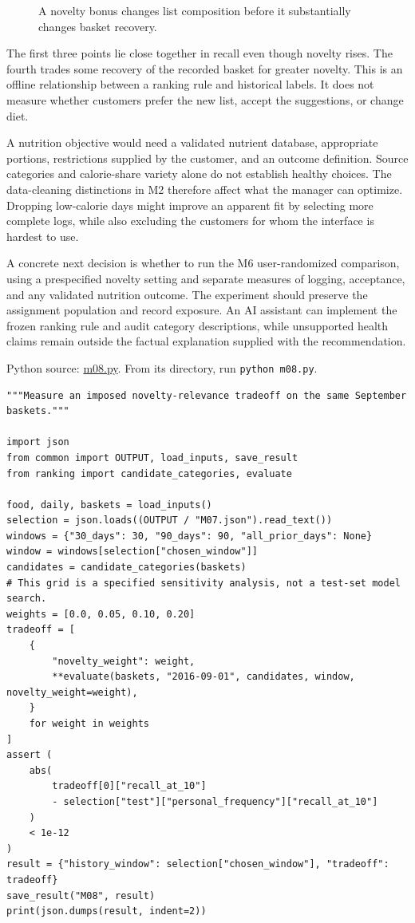 \begin{figure}[htbp]
\centering

\caption{A novelty bonus changes list composition before it substantially changes basket recovery.}\label{fig:M08_mhealth_tradeoff}
\end{figure}

The first three points lie close together in recall even though novelty
rises. The fourth trades some recovery of the recorded basket for
greater novelty. This is an offline relationship between a ranking rule
and historical labels. It does not measure whether customers prefer the
new list, accept the suggestions, or change diet.

A nutrition objective would need a validated nutrient database,
appropriate portions, restrictions supplied by the customer, and an
outcome definition. Source categories and calorie-share variety alone do
not establish healthy choices. The data-cleaning distinctions in M2
therefore affect what the manager can optimize. Dropping low-calorie
days might improve an apparent fit by selecting more complete logs,
while also excluding the customers for whom the interface is hardest to
use.

A concrete next decision is whether to run the M6 user-randomized
comparison, using a prespecified novelty setting and separate measures
of logging, acceptance, and any validated nutrition outcome. The
experiment should preserve the assignment population and record
exposure. An AI assistant can implement the frozen ranking rule and
audit category descriptions, while unsupported health claims remain
outside the factual explanation supplied with the recommendation.

\FloatBarrier
{}
Python source:
\href{../03_Data_and_Code/mHealth/recurring_examples/m08.py}{m08.py}.
From its directory, run \texttt{python\ m08.py}.

\begin{Verbatim}[breaklines,breakanywhere,fontsize=\small]
"""Measure an imposed novelty-relevance tradeoff on the same September baskets."""

import json
from common import OUTPUT, load_inputs, save_result
from ranking import candidate_categories, evaluate

food, daily, baskets = load_inputs()
selection = json.loads((OUTPUT / "M07.json").read_text())
windows = {"30_days": 30, "90_days": 90, "all_prior_days": None}
window = windows[selection["chosen_window"]]
candidates = candidate_categories(baskets)
# This grid is a specified sensitivity analysis, not a test-set model search.
weights = [0.0, 0.05, 0.10, 0.20]
tradeoff = [
    {
        "novelty_weight": weight,
        **evaluate(baskets, "2016-09-01", candidates, window, novelty_weight=weight),
    }
    for weight in weights
]
assert (
    abs(
        tradeoff[0]["recall_at_10"]
        - selection["test"]["personal_frequency"]["recall_at_10"]
    )
    < 1e-12
)
result = {"history_window": selection["chosen_window"], "tradeoff": tradeoff}
save_result("M08", result)
print(json.dumps(result, indent=2))
\end{Verbatim}

